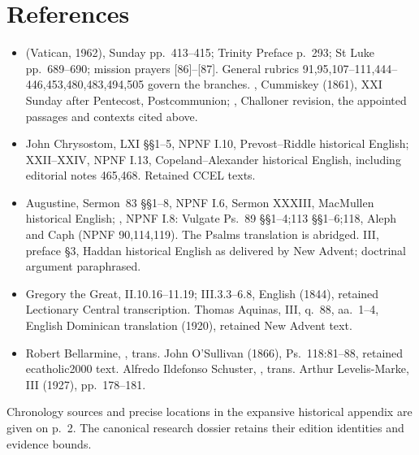 \section{References}
\begin{itemize}
\item {} (Vatican, 1962), Sunday pp.~413--415; Trinity Preface p.~293; St Luke pp.~689--690; mission prayers [86]--[87]. General rubrics 91,95,107--111,444--446,453,480,483,494,505 govern the branches. , Cummiskey (1861), XXI Sunday after Pentecost, Postcommunion; , Challoner revision, the appointed passages and contexts cited above.
\item John Chrysostom,  LXI \S\S1--5, NPNF I.10, Prevost--Riddle historical English;  XXII--XXIV, NPNF I.13, Copeland--Alexander historical English, including editorial notes 465,468. Retained CCEL texts.
\item Augustine, Sermon~83 \S\S1--8, NPNF I.6, Sermon XXXIII, MacMullen historical English; , NPNF I.8: Vulgate Ps.~89 \S\S1--4;113 \S\S1--6;118, Aleph and Caph (NPNF 90,114,119). The Psalms translation is abridged.  III, preface \S3, Haddan historical English as delivered by New Advent; doctrinal argument paraphrased.
\item Gregory the Great,  II.10.16--11.19; III.3.3--6.8,  English (1844), retained Lectionary Central transcription. Thomas Aquinas,  III, q.~88, aa.~1--4, English Dominican translation (1920), retained New Advent text.
\item Robert Bellarmine, , trans. John O'Sullivan (1866), Ps.~118:81--88, retained ecatholic2000 text. Alfredo Ildefonso Schuster, , trans. Arthur Levelis-Marke, III (1927), pp.~178--181.
\end{itemize}
Chronology sources and precise locations in the expansive historical appendix are given on p.~2. The canonical research dossier retains their edition identities and evidence bounds.
